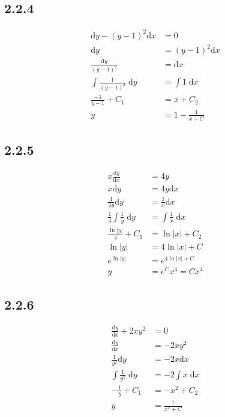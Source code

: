 \documentclass{article}
\begin{document}
\newpage
\subsection{2.2.4}
\begin{align*}
    \mathrm{d}y-\left(y-1\right)^2 \mathrm{d}x &= 0 \\
    \mathrm{d}y &= \left(y-1\right)^2\mathrm{d}x \\
    \frac{\mathrm{d}y}{\left(y-1\right)^2} &= \mathrm{d}x \\
    \int \frac{1}{\left(y-1\right)^2} \; \mathrm{d}y &= \int 1 \; \mathrm{d}x \\
    \frac{-1}{y-1} +C_1 &= x+ C_2 \\
    y &=1- \frac{1}{x+C}
\end{align*}

\subsection{2.2.5}
\begin{align*}
    x \frac{\mathrm{d}y}{\mathrm{d}x} &= 4y \\
    x\mathrm{d}y &= 4y\mathrm{d}x \\
    \frac{1}{4y}\mathrm{d}y &= \frac{1}{x}\mathrm{d}x \\
    \frac{1}{4}\int \frac{1}{y} \; \mathrm{d}y &= \int \frac{1}{x} \; \mathrm{d}x \\
    \frac{\ln |y| }{4} +C_1 &= \ln |x| + C_2 \\
    \ln |y|  &=  4\ln|x| +C \\
    e^{\ln |y|} &= e^{4\ln|x|+C} \\
    y  &= e^{C}x^{4} = Cx^4 
\end{align*}

\subsection{2.2.6}
\begin{align*}
    \frac{\mathrm{d}y}{\mathrm{d}x}+2xy^2 &= 0 \\
    \frac{\mathrm{d}y}{\mathrm{d}x} &= -2xy^2 \\
    \frac{1}{y^2}\mathrm{d}y &= -2x\mathrm{d}x \\
    \int \frac{1}{y^2} \; \mathrm{d}y &=-2 \int x \; \mathrm{d}x \\
    -\frac{1}{y}+C_1 &= -x^2+C_2 \\
    y  &=  \frac{1}{x^2+C}
\end{align*}
\end{document}
